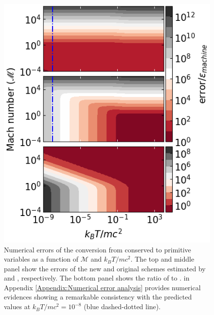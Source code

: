 \documentclass[twocolumn]{aastex63}
\begin{document}
\begin{figure}
	\includegraphics[width=\columnwidth]{ErrorDistributionImproved.png}
    \caption{Numerical errors of the conversion from conserved to primitive variables as a function of $\mathscr{M}$ and $k_{B}T/mc^2$. The top and middle panel show the errors of the new and original schemes estimated by  and , respectively. The bottom panel shows the ratio of  to .  in Appendix \ref{Appendix:Numerical error analysis} provides numerical evidences showing a remarkable consistency with the predicted values at $k_{B}T/mc^2=10^{-8}$ (blue dashed-dotted line).}
   \label{fig:ErrorDistribution}
\end{figure}
\end{document}
